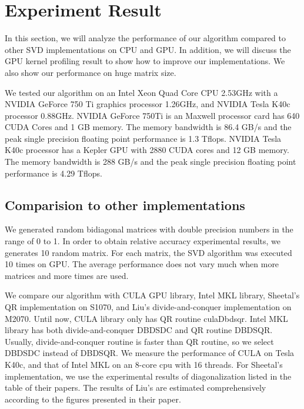 \section{Experiment Result}
In this section, we will analyze the performance of our algorithm compared to other SVD implementations on CPU and GPU.
In addition, we will discuss the GPU kernel profiling result to show how to improve our implementations.
We also show our performance on huge matrix size.

We tested our algorithm on an Intel Xeon Quad Core CPU 2.53GHz with a NVIDIA GeForce 750 Ti graphics processor 1.26GHz, and NVIDIA Tesla K40c processor 0.88GHz.
NVIDIA GeForce 750Ti is an Maxwell processor card has 640 CUDA Cores and 1 GB memory.
The memory bandwidth is 86.4 GB/s and the peak single precision floating point performance is 1.3 Tflops.
NVIDIA Tesla K40c processor has a Kepler GPU with 2880 CUDA cores and 12 GB memory.
The memory bandwidth is 288 GB/s and the peak single precision floating point performance is 4.29 Tflops.

\subsection{Comparision to other implementations}
We generated random bidiagonal matrices with double precision numbers in the range of 0 to 1.
In order to obtain relative accuracy experimental results, we generates 10 random matrix.
For each matrix, the SVD algorithm was executed 10 times on GPU.
The average performance does not vary much when more matrices and more times are used.

We compare our algorithm with CULA GPU library, Intel MKL library, Sheetal's QR implementation on S1070, and Liu's divide-and-conquer implementation on M2070.
Until now, CULA library only has QR routine culaDbdsqr.
Intel MKL library has both divide-and-conquer DBDSDC and QR routine DBDSQR.
Usually, divide-and-conquer routine is faster than QR routine, so we select DBDSDC instead of DBDSQR.
We measure the performance of CULA on Tesla K40c, and that of Intel MKL on an 8-core cpu with 16 threads.
For Sheetal's implementation, we use the experimental results of diagonalization listed in the table of their papers.
The results of Liu's are estimated comprehensively according to the figures presented in their paper.

